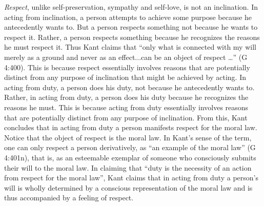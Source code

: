 \emph{Respect}, unlike self-preservation, sympathy and self-love, is not an inclination. In acting from inclination, a person attempts to achieve some purpose because he antecedently wants to. But a person respects something not because he wants to respect it. Rather, a person respects something because he recognizes the reasons he must respect it. Thus Kant claims that ``only what is connected with my will merely as a ground and never as an effect...can be an object of respect \ldots'' (G 4:400). This is because respect essentially involves reasons that are potentially distinct from any purpose of inclination that might be achieved by acting. In acting from duty, a person does his duty, not because he antecedently wants to. Rather, in acting from duty, a person does his duty because he recognizes the reasons he must. This is because acting from duty essentially involves reasons that are potentially distinct from any purpose of inclination. From this, Kant concludes that in acting from duty a person manifests respect for the moral law. Notice that the object of respect is the moral law. In Kant's sense of the term, one can only respect a person derivatively, as ``an example of the moral law'' (G 4:401n), that is, as an esteemable exemplar of someone who consciously submits their will to the moral law. In claiming that ``duty is the necessity of an action from respect for the moral law'', Kant claims that in acting from duty a person's will is wholly determined by a conscious representation of the moral law and is thus accompanied by a feeling of respect. \change

% 

